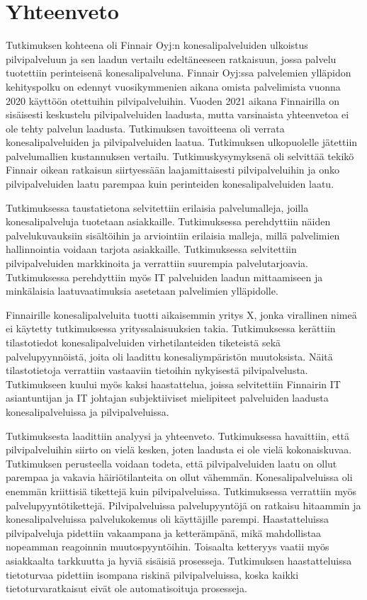 \chapter{Yhteenveto\label{conclusions}}
Tutkimuksen kohteena oli Finnair Oyj:n konesalipalveluiden ulkoistus pilvipalveluun ja sen laadun vertailu edeltäneeseen ratkaisuun, jossa palvelu tuotettiin perinteisenä konesalipalveluna. Finnair Oyj:ssa palvelemien ylläpidon kehityspolku on edennyt vuosikymmenien aikana omista palvelimista vuonna 2020 käyttöön otettuihin pilvipalveluihin. Vuoden 2021 aikana Finnairilla on sisäisesti keskustelu pilvipalveluiden laadusta, mutta varsinaista yhteenvetoa ei ole tehty palvelun laadusta. Tutkimuksen tavoitteena oli verrata konesalipalveluiden ja pilvipalveluiden laatua. Tutkimuksen ulkopuolelle jätettiin palvelumallien kustannuksen vertailu. Tutkimuskysymyksenä oli selvittää tekikö Finnair oikean ratkaisun siirtyessään laajamittaisesti pilvipalveluihin ja onko pilvipalveluiden laatu parempaa kuin perinteiden konesalipalveluiden laatu.

Tutkimuksessa taustatietona selvitettiin erilaisia palvelumalleja, joilla konesalipalveluja tuotetaan asiakkaille. Tutkimuksessa perehdyttiin näiden palvelukuvauksiin sisältöihin ja arviointiin erilaisia malleja, millä palvelimien hallinnointia voidaan tarjota asiakkaille. Tutkimuksessa selvitettiin pilvipalveluiden markkinoita ja verrattiin suurempia palvelutarjoavia. Tutkimuksessa perehdyttiin myös IT palveluiden laadun mittaamiseen ja minkälaisia laatuvaatimuksia asetetaan palvelimien ylläpidolle.

Finnairille konesalipalveluita tuotti aikaisemmin yritys X, jonka virallinen nimeä ei käytetty tutkimuksessa yrityssalaisuuksien takia. Tutkimuksessa kerättiin tilastotiedot konesalipalveluiden virhetilanteiden tiketeistä sekä palvelupyynnöistä, joita oli laadittu konesaliympäristön muutoksista. Näitä tilastotietoja verrattiin vastaaviin tietoihin nykyisestä pilvipalvelusta. Tutkimukseen kuului myös kaksi haastattelua, joissa selvitettiin Finnairin IT asiantuntijan ja IT johtajan subjektiiviset mielipiteet palveluiden laadusta konesalipalveluissa ja pilvipalveluissa.

Tutkimuksesta laadittiin analyysi ja yhteenveto. Tutkimuksessa havaittiin, että pilvipalveluihin siirto on vielä kesken, joten laadusta ei ole vielä kokonaiskuvaa. Tutkimuksen perusteella voidaan todeta, että pilvipalveluiden laatu on ollut parempaa ja vakavia häiriötilanteita on ollut vähemmän. Konesalipalveluissa oli enemmän kriittisiä tikettejä kuin pilvipalveluissa. Tutkimuksessa verrattiin myös palvelupyyntötikettejä. Pilvipalveluissa palvelupyyntöjä on ratkaisu hitaammin ja konesalipalveluissa palvelukokemus oli käyttäjille parempi. Haastatteluissa pilvipalveluja pidettiin vakaampana ja ketterämpänä, mikä mahdollistaa nopeamman reagoinnin muutospyyntöihin. Toisaalta ketteryys vaatii myös asiakkaalta tarkkuutta ja hyviä sisäisiä prosesseja. Tutkimuksen haastatteluissa tietoturvaa pidettiin isompana riskinä pilvipalveluissa, koska kaikki tietoturvaratkaisut eivät ole automatisoituja prosesseja.

